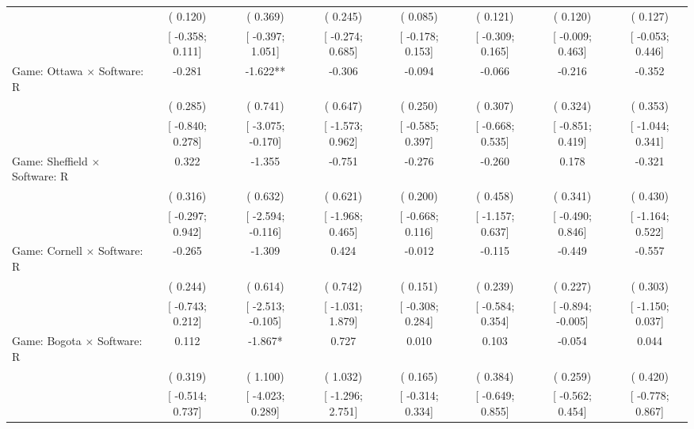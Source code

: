 \begin{tabular}{l*{7}{c}}
                    &(    0.120)   &(    0.369)   &(    0.245)   &(    0.085)   &(    0.121)   &(    0.120)   &(    0.127)   \\
                    &[   -0.358;     0.111]   &[   -0.397;     1.051]   &[   -0.274;     0.685]   &[   -0.178;     0.153]   &[   -0.309;     0.165]   &[   -0.009;     0.463]   &[   -0.053;     0.446]   \\
Game: Ottawa $\times$ Software: R &   -0.281   &   -1.622**   &   -0.306   &   -0.094   &   -0.066   &   -0.216   &   -0.352   \\
                    &(    0.285)   &(    0.741)   &(    0.647)   &(    0.250)   &(    0.307)   &(    0.324)   &(    0.353)   \\
                    &[   -0.840;     0.278]   &[   -3.075;    -0.170]   &[   -1.573;     0.962]   &[   -0.585;     0.397]   &[   -0.668;     0.535]   &[   -0.851;     0.419]   &[   -1.044;     0.341]   \\
Game: Sheffield $\times$ Software: R &    0.322   &   -1.355   &   -0.751   &   -0.276   &   -0.260   &    0.178   &   -0.321   \\
                    &(    0.316)   &(    0.632)   &(    0.621)   &(    0.200)   &(    0.458)   &(    0.341)   &(    0.430)   \\
                    &[   -0.297;     0.942]   &[   -2.594;    -0.116]   &[   -1.968;     0.465]   &[   -0.668;     0.116]   &[   -1.157;     0.637]   &[   -0.490;     0.846]   &[   -1.164;     0.522]   \\
Game: Cornell $\times$ Software: R &   -0.265   &   -1.309   &    0.424   &   -0.012   &   -0.115   &   -0.449   &   -0.557   \\
                    &(    0.244)   &(    0.614)   &(    0.742)   &(    0.151)   &(    0.239)   &(    0.227)   &(    0.303)   \\
                    &[   -0.743;     0.212]   &[   -2.513;    -0.105]   &[   -1.031;     1.879]   &[   -0.308;     0.284]   &[   -0.584;     0.354]   &[   -0.894;    -0.005]   &[   -1.150;     0.037]   \\
Game: Bogota $\times$ Software: R &    0.112   &   -1.867*   &    0.727   &    0.010   &    0.103   &   -0.054   &    0.044   \\
                    &(    0.319)   &(    1.100)   &(    1.032)   &(    0.165)   &(    0.384)   &(    0.259)   &(    0.420)   \\
                    &[   -0.514;     0.737]   &[   -4.023;     0.289]   &[   -1.296;     2.751]   &[   -0.314;     0.334]   &[   -0.649;     0.855]   &[   -0.562;     0.454]   &[   -0.778;     0.867]   \\

\end{tabular}
